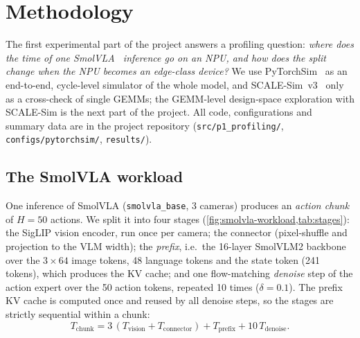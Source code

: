 
\section{Methodology}
\label{sec:methodology}

The first experimental part of the project answers a profiling question: \emph{where does the time of one SmolVLA~\cite{smolvla2025} inference go on an NPU, and how does the split change when the NPU becomes an edge-class device?} We use PyTorchSim~\cite{pytorchsim} as an end-to-end, cycle-level simulator of the whole model, and SCALE-Sim~v3~\cite{samajdar2020scalesim,scalesimv3} only as a cross-check of single GEMMs; the GEMM-level design-space exploration with SCALE-Sim is the next part of the project. All code, configurations and summary data are in the project repository (\texttt{src/p1\_profiling/}, \texttt{configs/pytorchsim/}, \texttt{results/}).

\subsection{The SmolVLA workload}
\label{subsec:method-workload}

One inference of SmolVLA (\texttt{smolvla\_base}, 3 cameras) produces an \emph{action chunk} of $H=50$ actions. We split it into four stages (\cref{fig:smolvla-workload,tab:stages}): the SigLIP vision encoder, run once per camera; the connector (pixel-shuffle and projection to the VLM width); the \emph{prefix}, i.e.\ the 16-layer SmolVLM2 backbone over the $3\times 64$ image tokens, 48 language tokens and the state token (241 tokens), which produces the KV cache; and one flow-matching \emph{denoise} step of the action expert over the 50 action tokens, repeated 10 times ($\delta = 0.1$). The prefix KV cache is computed once and reused by all denoise steps, so the stages are strictly sequential within a chunk:
\begin{equation}
  T_\text{chunk} = 3\,(T_\text{vision} + T_\text{connector}) + T_\text{prefix} + 10\,T_\text{denoise}.
  \label{eq:chunk}
\end{equation}

